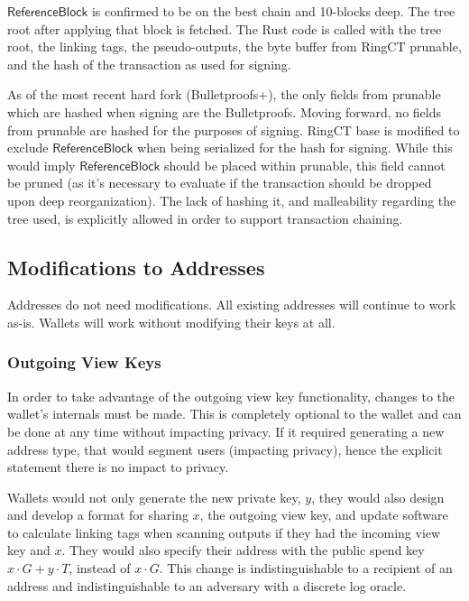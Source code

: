 \documentclass[]{article}
\begin{document}
$\mathsf{ReferenceBlock}$ is confirmed to be on the best chain and 10-blocks deep. The tree root after applying that block is fetched. The Rust code is called with the tree root, the linking tags, the pseudo-outputs, the byte buffer from RingCT prunable, and the hash of the transaction as used for signing.

As of the most recent hard fork (Bulletproofs+), the only fields from prunable which are hashed when signing are the Bulletproofs. Moving forward, no fields from prunable are hashed for the purposes of signing. RingCT base is modified to exclude $\mathsf{ReferenceBlock}$ when being serialized for the hash for signing. While this would imply $\mathsf{ReferenceBlock}$ should be placed within prunable, this field cannot be pruned (as it's necessary to evaluate if the transaction should be dropped upon deep reorganization). The lack of hashing it, and malleability regarding the tree used, is explicitly allowed in order to support transaction chaining.

\subsection{Modifications to Addresses}

Addresses do not need modifications. All existing addresses will continue to work as-is. Wallets will work without modifying their keys at all.

\subsubsection{Outgoing View Keys}

In order to take advantage of the outgoing view key functionality, changes to the wallet's internals must be made. This is completely optional to the wallet and can be done at any time without impacting privacy. If it required generating a new address type, that would segment users (impacting privacy), hence the explicit statement there is no impact to privacy.

Wallets would not only generate the new private key, $y$, they would also design and develop a format for sharing $x$, the outgoing view key, and update software to calculate linking tags when scanning outputs if they had the incoming view key and $x$. They would also specify their address with the public spend key $x \cdot G + y \cdot T$, instead of $x \cdot G$. This change is indistinguishable to a recipient of an address and indistinguishable to an adversary with a discrete log oracle.
\end{document}
